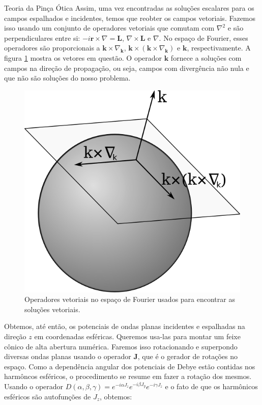 \begin{chapter}{Teoria da Pinça Ótica}
Assim, uma vez encontradas as soluções escalares para os campos espalhados e incidentes, temos que reobter os campos vetoriais. Fazemos isso usando um conjunto de operadores vetoriais que comutam com $\nabla ^2$ e são perpendiculares entre si: $-i {\mathbf r}\times\nabla = {\mathbf L}$, $\nabla \times {\mathbf L}$ e $\nabla$. No espaço de Fourier, esses operadores são proporcionais a ${\mathbf k}\times \nabla_{\mathbf k}$, ${\mathbf k}\times({\mathbf k}\times \nabla_{\mathbf k})$ e ${\mathbf k}$, respectivamente. A figura \ref{vet_fourier} mostra os vetores em questão. O operador ${\mathbf k}$ fornece a soluções com campos na direção de propagação, ou seja, campos com divergência não nula e que não são soluções do nosso problema.
%
\begin{figure}[h]
\begin{center}
\includegraphics[scale=0.5]{vec_fourier}
\caption{Operadores vetoriais no espaço de Fourier usados para encontrar as soluções vetoriais.}
\label{vet_fourier}
\end{center}
\end{figure}
%
Obtemos, até então, os potenciais de ondas planas incidentes e espalhadas na direção $z$ em coordenadas esféricas. Queremos usa-las para montar um feixe cônico de alta abertura numérica. Faremos isso rotacionando e superpondo diversas ondas planas usando o operador ${\mathbf J}$, que é o gerador de rotações no espaço. Como a dependência angular dos potenciais de Debye estão contidas nos harmôncos esféricos, o procedimento se resume em fazer a rotação dos mesmos. Usando o operador $D(\alpha,\beta,\gamma)=e^{-i\alpha J_z}e^{-i\beta J_y}e^{-i\gamma J_z}$ e o fato de que os harmônicos esféricos são autofunções de $J_z$, obtemos:


\end{chapter}
